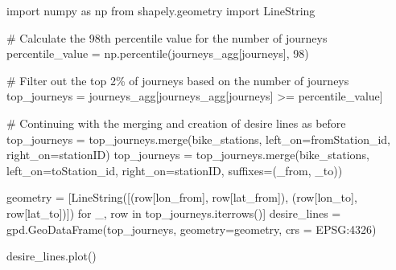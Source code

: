 \documentclass[
  letterpaper,
  DIV=11,
  numbers=noendperiod]{scrreprt}
\newenvironment{Shaded}{\begin{snugshade}}{\end{snugshade}}
\newcommand{\CommentTok}[1]{\textcolor[rgb]{0.37,0.37,0.37}{#1}}
\newcommand{\ControlFlowTok}[1]{\textcolor[rgb]{0.00,0.23,0.31}{#1}}
\newcommand{\DecValTok}[1]{\textcolor[rgb]{0.68,0.00,0.00}{#1}}
\newcommand{\ImportTok}[1]{\textcolor[rgb]{0.00,0.46,0.62}{#1}}
\newcommand{\KeywordTok}[1]{\textcolor[rgb]{0.00,0.23,0.31}{#1}}
\newcommand{\NormalTok}[1]{\textcolor[rgb]{0.00,0.23,0.31}{#1}}
\newcommand{\OperatorTok}[1]{\textcolor[rgb]{0.37,0.37,0.37}{#1}}
\newcommand{\StringTok}[1]{\textcolor[rgb]{0.13,0.47,0.30}{#1}}
\begin{document}
\begin{Shaded}
\begin{Highlighting}[]
\ImportTok{import}\NormalTok{ numpy }\ImportTok{as}\NormalTok{ np}
\ImportTok{from}\NormalTok{ shapely.geometry }\ImportTok{import}\NormalTok{ LineString}

\CommentTok{\# Calculate the 98th percentile value for the number of journeys}
\NormalTok{percentile\_value }\OperatorTok{=}\NormalTok{ np.percentile(journeys\_agg[}\StringTok{\textquotesingle{}journeys\textquotesingle{}}\NormalTok{], }\DecValTok{98}\NormalTok{)}

\CommentTok{\# Filter out the top 2\% of journeys based on the number of journeys}
\NormalTok{top\_journeys }\OperatorTok{=}\NormalTok{ journeys\_agg[journeys\_agg[}\StringTok{\textquotesingle{}journeys\textquotesingle{}}\NormalTok{] }\OperatorTok{\textgreater{}=}\NormalTok{ percentile\_value]}

\CommentTok{\# Continuing with the merging and creation of desire lines as before}
\NormalTok{top\_journeys }\OperatorTok{=}\NormalTok{ top\_journeys.merge(bike\_stations, left\_on}\OperatorTok{=}\StringTok{\textquotesingle{}fromStation\_id\textquotesingle{}}\NormalTok{, right\_on}\OperatorTok{=}\StringTok{\textquotesingle{}stationID\textquotesingle{}}\NormalTok{)}
\NormalTok{top\_journeys }\OperatorTok{=}\NormalTok{ top\_journeys.merge(bike\_stations, left\_on}\OperatorTok{=}\StringTok{\textquotesingle{}toStation\_id\textquotesingle{}}\NormalTok{, right\_on}\OperatorTok{=}\StringTok{\textquotesingle{}stationID\textquotesingle{}}\NormalTok{, suffixes}\OperatorTok{=}\NormalTok{(}\StringTok{\textquotesingle{}\_from\textquotesingle{}}\NormalTok{, }\StringTok{\textquotesingle{}\_to\textquotesingle{}}\NormalTok{))}

\NormalTok{geometry }\OperatorTok{=}\NormalTok{ [LineString([(row[}\StringTok{\textquotesingle{}lon\_from\textquotesingle{}}\NormalTok{], row[}\StringTok{\textquotesingle{}lat\_from\textquotesingle{}}\NormalTok{]), (row[}\StringTok{\textquotesingle{}lon\_to\textquotesingle{}}\NormalTok{], row[}\StringTok{\textquotesingle{}lat\_to\textquotesingle{}}\NormalTok{])]) }\ControlFlowTok{for}\NormalTok{ \_, row }\KeywordTok{in}\NormalTok{ top\_journeys.iterrows()]}
\NormalTok{desire\_lines }\OperatorTok{=}\NormalTok{ gpd.GeoDataFrame(top\_journeys, geometry}\OperatorTok{=}\NormalTok{geometry, crs }\OperatorTok{=} \StringTok{\textquotesingle{}EPSG:4326\textquotesingle{}}\NormalTok{)}

\NormalTok{desire\_lines.plot()}
\end{Highlighting}
\end{Shaded}
\end{document}
